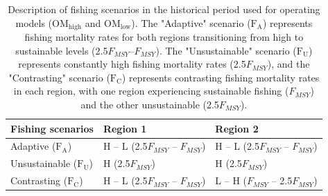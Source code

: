 \begin{table}[H]
\centering
\caption{Description of fishing scenarios in the historical period used for operating models ($\text{OM}_{\text{high}}$ and $\text{OM}_{\text{low}}$). The "Adaptive" scenario ($\text{F}_\text{A}$) represents fishing mortality rates for both regions transitioning from high to sustainable levels (2.5\(F_{MSY}\)–\(F_{MSY}\)). The "Unsustainable" scenario ($\text{F}_\text{U}$) represents constantly high fishing mortality rates (2.5\(F_{MSY}\)), and the "Contrasting" scenario ($\text{F}_\text{C}$) represents contrasting fishing mortality rates in each region, with one region experiencing sustainable fishing (\(F_{MSY}\)) and the other unsustainable (2.5\(F_{MSY}\)).
}
\label{F_scenario_table}
\begin{tabular}{p{5cm} p{5cm} p{5cm}}
\toprule
\textbf{Fishing scenarios} & \textbf{Region 1} & \textbf{Region 2} \\
\midrule
Adaptive ($\text{F}_\text{A}$) & H – L (2.5\(F_{MSY}\) – \(F_{MSY}\)) & H – L (2.5\(F_{MSY}\) – \(F_{MSY}\)) \\
Unsustainable ($\text{F}_\text{U}$) & H (2.5\(F_{MSY}\)) & H (2.5\(F_{MSY}\)) \\
Contrasting ($\text{F}_\text{C}$) & H – L (2.5\(F_{MSY}\) – \(F_{MSY}\)) & L – H (\(F_{MSY}\) – 2.5\(F_{MSY}\)) \\
\bottomrule
\end{tabular}
\end{table}
